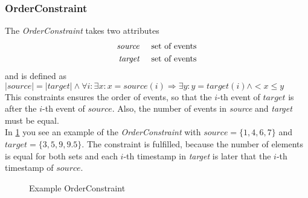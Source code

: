 	\subsubsection{OrderConstraint}
		The \emph{OrderConstraint} takes two attributes
		\begin{align*}
			\emph{source} & \hspace{.5cm}\text{set of events}\\
			\emph{target} & \hspace{.5cm}\text{set of events}
		\end{align*}
		and is defined as\\[10pt]
		\begin{math}
			|source| = |target| \land \forall i:\exists x: x=source(i)\Rightarrow \exists y: y=target(i)\land < x \leq y
		\end{math}\\[10pt]
		This constraints ensures the order of events, so that the $i$-th event of $target$ is after the $i$-th event of $source$. Also, the number of events in \emph{source} and \emph{target} must be equal.\\
		In \ref{fig:OrderConstraintExample} you see an example of the \emph{OrderConstraint} with $source = \{1, 4, 6, 7\}$ and $target = \{3, 5, 9, 9.5\}$. The constraint is fulfilled, because the number of elements is equal for both sets and each $i$-th timestamp in \emph{target} is later that the $i$-th timestamp of $source$.
		\begin{figure}
			\caption{Example OrderConstraint}
			\label{fig:OrderConstraintExample}
		\end{figure}
		
		
